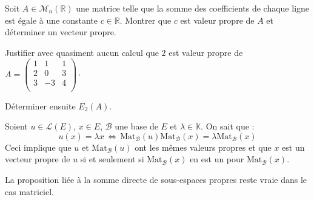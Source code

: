 \documentclass[a4paper,10pt]{report}
\begin{document}
\medskip

\begin{ex} Soit $A \in \mathcal{M}_n(\mathbb{R})$ une matrice telle que la somme des coefficients de chaque ligne est égale à une constante $c \in \mathbb{R}$. Montrer que $c$ est valeur propre de $A$ et déterminer un vecteur propre.

\vspace{5cm}

\end{ex}

\begin{exa} Justifier avec quasiment aucun calcul que $2$ est valeur propre de $A= \begin{pmatrix}
1& 1 & 1 \\
2  & 0 & 3 \\
3 & -3 & 4 \\
\end{pmatrix}\cdot$

\noindent Déterminer ensuite $E_2(A)$.
\end{exa}
%

\begin{rems} 
\item Soient $u \in \mathcal{L}(E)$, $x \in E$, $\mathcal{B}$ une base de $E$ et $\lambda \in \mathbb{K}$. On sait que :
$$ u(x) = \lambda x \, \Longleftrightarrow \, \textrm{Mat}_{\mathcal{B}}(u) \textrm{Mat}_{\mathcal{B}}(x) = \lambda \textrm{Mat}_{\mathcal{B}}(x) $$
Ceci implique que $u$ et $\textrm{Mat}_{\mathcal{B}}(u)$ ont les mêmes valeurs propres et que $x$ est un vecteur propre de $u$ si et seulement si $\textrm{Mat}_{\mathcal{B}}(x)$ en est un pour $\textrm{Mat}_{\mathcal{B}}(x)$.
\item La proposition liée à la somme directe de sous-espaces propres reste vraie dans le cas matriciel.
\end{rems}

%
%
%
%
\end{document}
